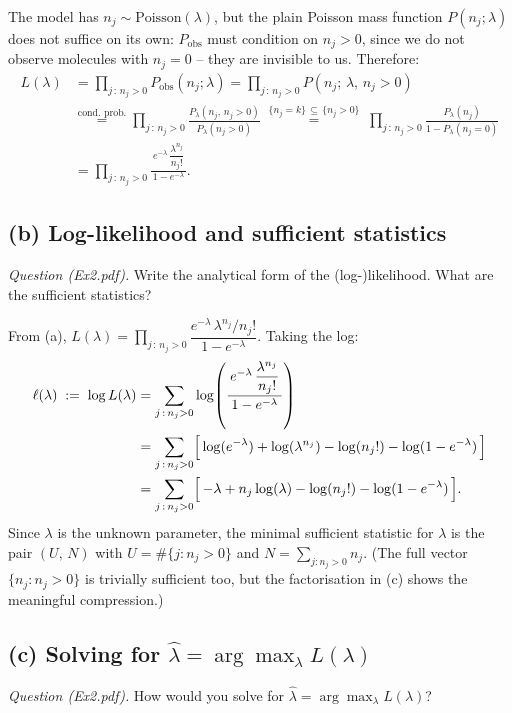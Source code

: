 \documentclass[11pt,a4paper]{article}
\newcommand{\Pois}{\mathrm{Poisson}}
\newcommand{\hlam}{\hat{\lambda}}
\begin{document}
The model has $n_j \sim \Pois(\lambda)$, but the plain Poisson mass function
$P(n_j;\lambda)$ does not suffice on its own: $P_{\mathrm{obs}}$ must condition
on $n_j > 0$, since we do not observe molecules with $n_j = 0$ -- they are
invisible to us. Therefore:
\begin{align*}
L(\lambda)
  &= \prod_{j\,:\,n_j > 0} P_{\mathrm{obs}}(n_j;\lambda)
   = \prod_{j\,:\,n_j > 0} P(n_j ;\, \lambda,\, n_j > 0) \\
  &\overset{\text{cond.\ prob.}}{=}
     \prod_{j\,:\,n_j > 0} \frac{P_\lambda(n_j,\, n_j > 0)}{P_\lambda(n_j > 0)}
   \;\overset{\{n_j=k\}\,\subseteq\,\{n_j>0\}}{=}\;
     \prod_{j\,:\,n_j > 0} \frac{P_\lambda(n_j)}{1 - P_\lambda(n_j = 0)} \\
  &= \prod_{j\,:\,n_j > 0} \frac{\,e^{-\lambda}\, \dfrac{\lambda^{n_j}}{n_j!}\,}{1 - e^{-\lambda}}.
\end{align*}

\subsection{(b) Log-likelihood and sufficient statistics}
\emph{Question (Ex2.pdf).} Write the analytical form of the (log-)likelihood.
What are the sufficient statistics?

From (a), $L(\lambda) = \prod_{j\,:\,n_j > 0} \dfrac{e^{-\lambda}\, \lambda^{n_j}/n_j!}{1 - e^{-\lambda}}$. Taking the log:
\begin{align*}
\ell(\lambda) \;:=\; \log L(\lambda)
  &= \sum_{j\,:\,n_j > 0} \log\!\left( \frac{\,e^{-\lambda}\, \dfrac{\lambda^{n_j}}{n_j!}\,}{1 - e^{-\lambda}} \right) \\
  &= \sum_{j\,:\,n_j > 0} \Bigl[\, \log(e^{-\lambda}) + \log(\lambda^{n_j}) - \log(n_j!) - \log(1 - e^{-\lambda}) \,\Bigr] \\
  &= \sum_{j\,:\,n_j > 0} \Bigl[\, -\lambda + n_j \log(\lambda) - \log(n_j!) - \log(1 - e^{-\lambda}) \,\Bigr].
\end{align*}
Since $\lambda$ is the unknown parameter, the minimal sufficient statistic for
$\lambda$ is the pair $(U,\,N)$ with $U = \#\{j : n_j > 0\}$ and
$N = \sum_{j : n_j > 0} n_j$. (The full vector $\{n_j : n_j > 0\}$ is trivially
sufficient too, but the factorisation in (c) shows the meaningful compression.)

\subsection{(c) Solving for $\hlam = \arg\max_\lambda L(\lambda)$}
\emph{Question (Ex2.pdf).} How would you solve for $\hat\lambda = \arg\max_\lambda L(\lambda)$?
\end{document}
